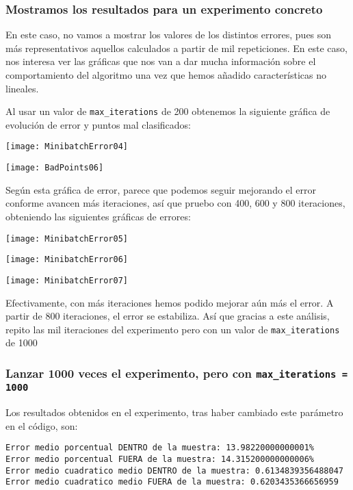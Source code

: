 \documentclass[11pt]{article}
\begin{document}
\subsubsection{Mostramos los resultados para un experimento concreto}

En este caso, no vamos a mostrar los valores de los distintos errores, pues son más representativos aquellos calculados a partir de mil repeticiones. En este caso, nos interesa ver las gráficas que nos van a dar mucha información sobre el comportamiento del algoritmo una vez que hemos añadido características no lineales.

Al usar un valor de \lstinline{max_iterations} de 200 obtenemos la siguiente gráfica de evolución de error y puntos mal clasificados:

\texttt{[image: MinibatchError04]}

\texttt{[image: BadPoints06]}

Según esta gráfica de error, parece que podemos seguir mejorando el error conforme avancen más iteraciones, así que pruebo con 400, 600 y 800 iteraciones, obteniendo las siguientes gráficas de errores:


\texttt{[image: MinibatchError05]}

\texttt{[image: MinibatchError06]}

\texttt{[image: MinibatchError07]}

Efectivamente, con más iteraciones hemos podido mejorar aún más el error. A partir de 800 iteraciones, el error se estabiliza. Así que gracias a este análisis, repito las mil iteraciones del experimento pero con un valor de \lstinline{max_iterations} de 1000

\subsubsection{Lanzar 1000 veces el experimento, pero con \lstinline{max_iterations = 1000}}

Los resultados obtenidos en el experimento, tras haber cambiado este parámetro en el código, son:

\begin{lstlisting}
Error medio porcentual DENTRO de la muestra: 13.98220000000001%
Error medio porcentual FUERA de la muestra: 14.315200000000006%
Error medio cuadratico medio DENTRO de la muestra: 0.6134839356488047
Error medio cuadratico medio FUERA de la muestra: 0.6203435366656959
\end{lstlisting}
\end{document}
